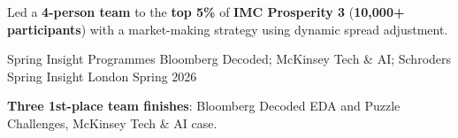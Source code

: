 \begin{cventries}
    {
      \begin{cvitems}
        \item {Led a \textbf{4-person team} to the \textbf{top 5\%} of \textbf{IMC Prosperity 3} (\textbf{10,000+ participants}) with a market-making strategy using dynamic spread adjustment.}
      \end{cvitems}
    }
  \cventry
    {Spring Insight Programmes}
    {Bloomberg Decoded; McKinsey Tech \& AI; Schroders Spring Insight}
    {London}
    {Spring 2026}
    {
      \begin{cvitems}
        \item {\textbf{Three 1st-place team finishes}: Bloomberg Decoded EDA and Puzzle Challenges, McKinsey Tech \& AI case.}
      \end{cvitems}
    }
\end{cventries}
